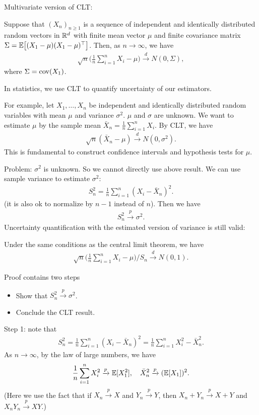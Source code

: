 \documentclass[11pt,letterpaper]{article}
\begin{document}
Multivariate version of CLT:
\begin{theorem}
  Suppose that $(X_n)_{n \geq 1}$ is a sequence of independent and identically distributed random vectors in $\mathbb{R}^d$ with finite mean vector $\mu$ and finite covariance matrix $\Sigma = {\mathbb{E}} \big[  (X_1 - \mu)(X_1 - \mu)^\top\big]$. Then, as $n \to \infty$, we have
  \begin{align*}
    \sqrt{n}\Big(\frac{1}{n} \sum_{i=1}^n X_i -  \mu\Big) \xrightarrow{d} N(0,\Sigma),
  \end{align*}
  where $\Sigma = \operatorname{cov}(X_1)$.
\end{theorem}
In statistics, we use CLT to quantify uncertainty of our estimators.

For example, let $X_1, \ldots, X_n$ be independent and identically distributed random variables with mean $\mu$ and variance $\sigma^2$. $\mu$ and $\sigma$ are unknown. We want to estimate $\mu$ by the sample mean $\bar{X}_n = \frac{1}{n} \sum_{i=1}^n X_i$. By CLT, we have
\begin{align*}
  \sqrt{n}(\bar{X}_n - \mu) \xrightarrow{d} N(0, \sigma^2).
\end{align*}
This is fundamental to construct confidence intervals and hypothesis tests for $\mu$.

Problem: $\sigma^2$ is unknown. So we cannot directly use above result. We can use sample variance to estimate $\sigma^2$:
\begin{align*}
  S_n^2 = \frac{1}{n} \sum_{i=1}^n (X_i - \bar{X}_n)^2.
\end{align*}
(it is also ok to normalize by $n-1$ instead of $n$).
Then we have
\begin{align*}
  S_n^2 \xrightarrow{p} \sigma^2.
\end{align*}
Uncertainty quantification with the estimated version of variance is still valid:
\begin{theorem}
  Under the same conditions as the central limit theorem, we have
  \begin{align*}
    \sqrt{n}\Big(\frac{1}{n} \sum_{i=1}^n X_i -  \mu\Big) / S_n \xrightarrow{d} N(0,1).
  \end{align*}
\end{theorem}
Proof contains two steps
\begin{itemize}
  \item Show that $S_n^2 \xrightarrow{p} \sigma^2$.
  \item Conclude the CLT result.
\end{itemize}
Step 1: note that
\begin{align*}
  S_n^2 = \frac{1}{n} \sum_{i=1}^n (X_i - \bar{X}_n)^2 = \frac{1}{n} \sum_{i = 1}^n X_i^2 - \bar{X}_n^2.
\end{align*}
As $n \to \infty$, by the law of large numbers, we have
\begin{align*}
  \frac{1}{n} \sum_{i = 1}^n X_i^2 \xrightarrow{p} {\mathbb{E}}[X_1^2], \quad \bar{X}_n^2 \xrightarrow{p} ({\mathbb{E}}[X_1])^2.
\end{align*}
(Here we use the fact that if $X_n \xrightarrow{p} X$ and $Y_n \xrightarrow{p} Y$, then $X_n + Y_n \xrightarrow{p} X + Y$ and $X_n Y_n \xrightarrow{p} XY$.)
\end{document}
